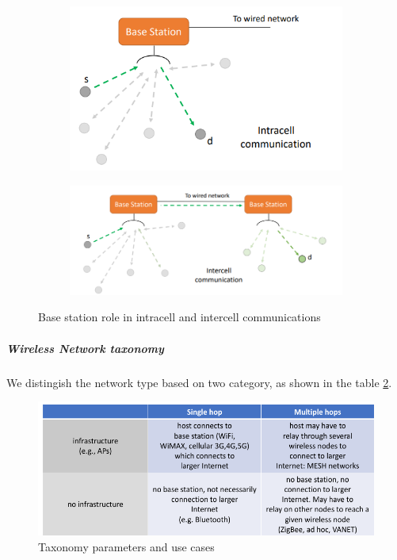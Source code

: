 \documentclass[10pt,a4paper]{report}
\theoremstyle{definition}
\begin{document}
\begin{itemize}
\begin{figure}
	\centering
	\begin{subfigure}{.5\textwidth}
		\centering
		\includegraphics[width=.9\linewidth]{images/Pasted image 20230531102906.png}
	\end{subfigure}%
	\begin{subfigure}{.5\textwidth}
		\centering
		\includegraphics[width=.9\linewidth]{images/Pasted image 20230531102921.png}
	\end{subfigure}
	\caption{Base station role in intracell and intercell communications}
	\label{intra-intercell-comm}
\end{figure}

\end{itemize}


\subparagraph{Wireless Network taxonomy}\label{sec:wireless-network-taxonomy}
We distingish the network type based on two category, as shown in the table \ref{infra-table}.
\begin{figure}[h]
	\centering\includegraphics[scale=0.50]{images/Pasted image 20230224163936.png}
	\caption{Taxonomy parameters and use cases}
	\label{infra-table}
\end{figure}
\end{document}
